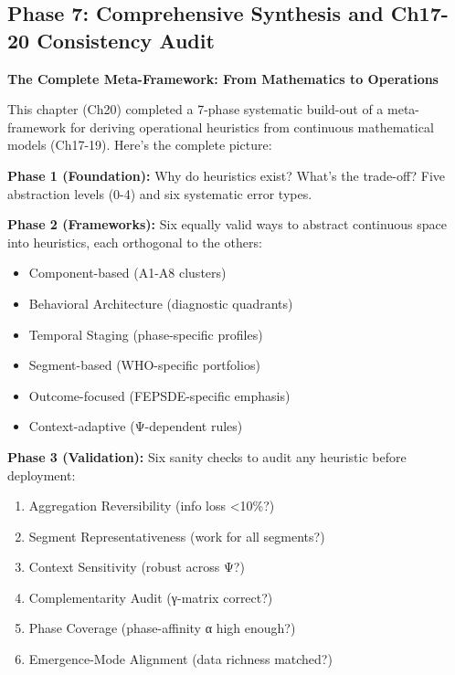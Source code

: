 \subsection{Phase 7: Comprehensive Synthesis and Ch17-20 Consistency Audit}
\label{subsec:20-phase-7-synthesis}

\textbf{The Complete Meta-Framework: From Mathematics to Operations}

This chapter (Ch20) completed a 7-phase systematic build-out of a meta-framework for deriving operational heuristics from continuous mathematical models (Ch17-19). Here's the complete picture:

\begin{definition}

\textbf{Phase 1 (Foundation):} Why do heuristics exist? What's the trade-off? Five abstraction levels (0-4) and six systematic error types.

\textbf{Phase 2 (Frameworks):} Six equally valid ways to abstract continuous space into heuristics, each orthogonal to the others:
\begin{itemize}[nosep]
\item Component-based (A1-A8 clusters)
\item Behavioral Architecture (diagnostic quadrants)
\item Temporal Staging (phase-specific profiles)
\item Segment-based (WHO-specific portfolios)
\item Outcome-focused (FEPSDE-specific emphasis)
\item Context-adaptive (Ψ-dependent rules)
\end{itemize}

\textbf{Phase 3 (Validation):} Six sanity checks to audit any heuristic before deployment:
\begin{enumerate}[nosep]
\item Aggregation Reversibility (info loss <10\%?)
\item Segment Representativeness (work for all segments?)
\item Context Sensitivity (robust across Ψ?)
\item Complementarity Audit (γ-matrix correct?)
\item Phase Coverage (phase-affinity α high enough?)
\item Emergence-Mode Alignment (data richness matched?)
\end{enumerate}


\end{definition}
